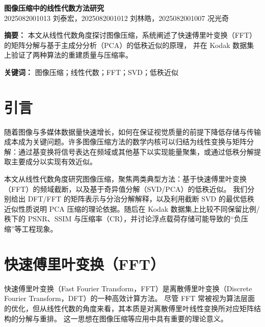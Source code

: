 \documentclass[12pt,a4paper]{article}
\begin{document}
\begin{center}
    {\LARGE \textbf{图像压缩中的线性代数方法研究}} \\[1em]
    2025082001013 刘泰宏，2025082001012 刘林皓，2025082001007 况光奇 \\[1em]
\end{center}

\vspace{1em}

\noindent\textbf{摘要：}
本文从线性代数角度探讨图像压缩，系统阐述了快速傅里叶变换（FFT）的矩阵分解与基于主成分分析（PCA）的低秩近似的原理，
并在 Kodak 数据集上验证了两种算法的重建质量与压缩率。

\vspace{0.5em}

\noindent\textbf{关键词：}
图像压缩；线性代数；FFT；SVD；低秩近似

\vspace{1.5em}

\section{引言}

随着图像与多媒体数据量快速增长，如何在保证视觉质量的前提下降低存储与传输成本成为关键问题。许多图像压缩方法的数学内核可以归结为线性变换与矩阵分解：通过基变换将信号表达在频域或其他基下以实现能量聚集，或通过低秩分解提取主要成分以实现有效近似。

 本文从线性代数角度研究图像压缩，聚焦两类典型方法：基于快速傅里叶变换（FFT）的频域截断，以及基于奇异值分解（SVD/PCA）的低秩近似。
 我们分别给出 DFT/FFT 的矩阵表示与分治分解解释，以及利用截断 SVD 的最优低秩近似性质说明 PCA 压缩的理论依据。随后在 Kodak 数据集上比较不同保留比例/秩下的 PSNR、SSIM 与压缩率（CR），并讨论浮点载荷存储可能导致的“负压缩”等工程现象。
\section{快速傅里叶变换（FFT）}
快速傅里叶变换（Fast Fourier Transform，FFT）是离散傅里叶变换（Discrete Fourier Transform，DFT）的一种高效计算方法。
尽管 FFT 常被视为算法层面的优化，但从线性代数的角度来看，其本质是对离散傅里叶线性变换所对应矩阵结构的分解与重排。
这一思想在图像压缩等应用中具有重要的理论意义。
\end{document}
